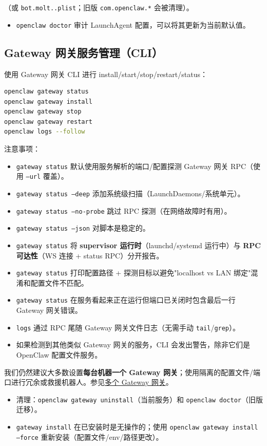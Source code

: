 （或 \texttt{bot.molt..plist}；旧版 \texttt{com.openclaw.*} 会被清理）。
\begin{itemize}
  \item \texttt{openclaw doctor} 审计 LaunchAgent 配置，可以将其更新为当前默认值。
\end{itemize}


\subsection{Gateway 网关服务管理（CLI）}


使用 Gateway 网关 CLI 进行 install/start/stop/restart/status：

\begin{lstlisting}[language=bash]
openclaw gateway status
openclaw gateway install
openclaw gateway stop
openclaw gateway restart
openclaw logs --follow
\end{lstlisting}


注意事项：

\begin{itemize}
  \item \texttt{gateway status} 默认使用服务解析的端口/配置探测 Gateway 网关 RPC（使用 \texttt{--url} 覆盖）。
  \item \texttt{gateway status --deep} 添加系统级扫描（LaunchDaemons/系统单元）。
  \item \texttt{gateway status --no-probe} 跳过 RPC 探测（在网络故障时有用）。
  \item \texttt{gateway status --json} 对脚本是稳定的。
  \item \texttt{gateway status} 将 \textbf{supervisor 运行时}（launchd/systemd 运行中）与 \textbf{RPC 可达性}（WS 连接 + status RPC）分开报告。
  \item \texttt{gateway status} 打印配置路径 + 探测目标以避免"localhost vs LAN 绑定"混淆和配置文件不匹配。
  \item \texttt{gateway status} 在服务看起来正在运行但端口已关闭时包含最后一行 Gateway 网关错误。
  \item \texttt{logs} 通过 RPC 尾随 Gateway 网关文件日志（无需手动 \texttt{tail}/\texttt{grep}）。
  \item 如果检测到其他类似 Gateway 网关的服务，CLI 会发出警告，除非它们是 OpenClaw 配置文件服务。
\end{itemize}

我们仍然建议大多数设置\textbf{每台机器一个 Gateway 网关}；使用隔离的配置文件/端口进行冗余或救援机器人。参见\href{/gateway/multiple-gateways}{多个 Gateway 网关}。
\begin{itemize}
  \item 清理：\texttt{openclaw gateway uninstall}（当前服务）和 \texttt{openclaw doctor}（旧版迁移）。
  \item \texttt{gateway install} 在已安装时是无操作的；使用 \texttt{openclaw gateway install --force} 重新安装（配置文件/env/路径更改）。
\end{itemize}


